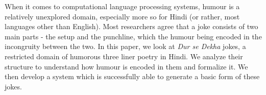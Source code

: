 When it comes to computational language processing systems, humour is a relatively unexplored domain, especially more so for Hindi (or rather, most languages other than English). Most researchers agree that a joke consists of two main parts - the setup and the punchline, which the humour being encoded in the incongruity between the two. In this paper, we look at \emph{Dur se Dekha} jokes, a restricted domain of humorous three liner poetry in Hindi. We analyze their structure to understand how humour is encoded in them and formalize it. We then develop a system which is successfully able to generate a basic form of these jokes.
